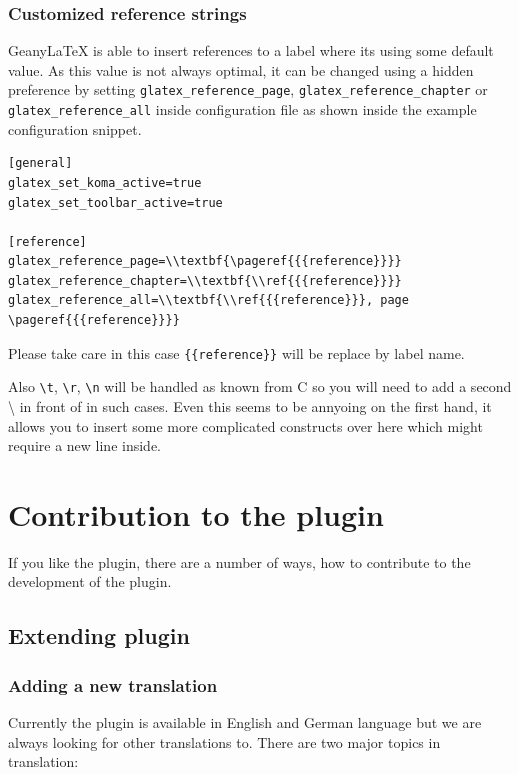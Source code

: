 \documentclass[%
a4paper,%
10pt,%
oneside,%
DIV18,
headsepline,
plainheadsepline,
footsepline,
plainfootsepline,
bibtotoc,%
liststotoc,%
BCOR12mm,%
halfparskip,%
openany,%
]{scrartcl}
\begin{document}
\subsubsection{Customized reference strings}

Geany\LaTeX{} is able to insert references to a label where its
using some default value. As this value is not always optimal, it
can be changed using a hidden preference by setting
\texttt{glatex\_reference\_page}, \texttt{glatex\_reference\_chapter} or
\texttt{glatex\_reference\_all} inside configuration file as shown inside
the example configuration snippet.

\begin{lstlisting}
[general]
glatex_set_koma_active=true
glatex_set_toolbar_active=true

[reference]
glatex_reference_page=\\textbf{\pageref{{{reference}}}}
glatex_reference_chapter=\\textbf{\\ref{{{reference}}}}
glatex_reference_all=\\textbf{\\ref{{{reference}}}, page \pageref{{{reference}}}}\end{lstlisting}

Please take care in this case \texttt{\{\{reference\}\}} will be
replace by label name.

Also \texttt{\textbackslash{}t}, \texttt{\textbackslash{}r},
\texttt{\textbackslash{}n} will be handled as known from C so you will
need to add a second \textbackslash{} in front of in such cases. Even
this seems to be annyoing on the first hand, it allows you to insert some
more complicated constructs over  here which might require a new line inside.

\section{Contribution to the plugin}
If you like the plugin, there are a number of ways, how to
contribute to the development of the plugin.

\subsection{Extending plugin}

\subsubsection{Adding a new translation}
\label{sec:translating}
Currently the plugin is available in English and German language but
we are always looking for other translations to. There are two major
topics in translation:
\end{document}
